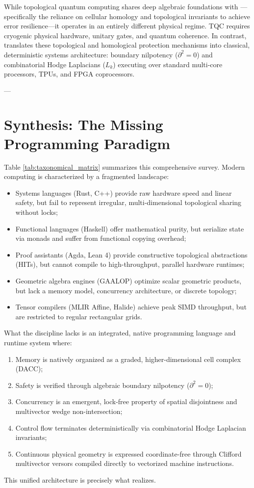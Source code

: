While topological quantum computing shares deep algebraic foundations with \ToposLang{}---specifically the reliance on cellular homology and topological invariants to achieve error resilience---it operates in an entirely different physical regime. TQC requires cryogenic physical hardware, unitary gates, and quantum coherence. In contrast, \ToposLang{} translates these topological and homological protection mechanisms into classical, deterministic systems architecture: boundary nilpotency ($\partial^2 = 0$) and combinatorial Hodge Laplacians ($L_k$) executing over standard multi-core processors, TPUs, and FPGA coprocessors.


---

\section{Synthesis: The Missing Programming Paradigm}
\label{sec:tax_synthesis}

Table \ref{tab:taxonomical_matrix} summarizes this comprehensive survey. Modern computing is characterized by a fragmented landscape:
\begin{itemize}[leftmargin=1.5cm]
    \item Systems languages (Rust, C++) provide raw hardware speed and linear safety, but fail to represent irregular, multi-dimensional topological sharing without locks;
    \item Functional languages (Haskell) offer mathematical purity, but serialize state via monads and suffer from functional copying overhead;
    \item Proof assistants (Agda, Lean 4) provide constructive topological abstractions (HITs), but cannot compile to high-throughput, parallel hardware runtimes;
    \item Geometric algebra engines (GAALOP) optimize scalar geometric products, but lack a memory model, concurrency architecture, or discrete topology;
    \item Tensor compilers (MLIR Affine, Halide) achieve peak SIMD throughput, but are restricted to regular rectangular grids.
\end{itemize}

What the discipline lacks is an integrated, native programming language and runtime system where:
\begin{enumerate}
    \item Memory is natively organized as a graded, higher-dimensional cell complex (DACC);
    \item Safety is verified through algebraic boundary nilpotency ($\partial^2 = 0$);
    \item Concurrency is an emergent, lock-free property of spatial disjointness and multivector wedge non-intersection;
    \item Control flow terminates deterministically via combinatorial Hodge Laplacian invariants;
    \item Continuous physical geometry is expressed coordinate-free through Clifford multivector versors compiled directly to vectorized machine instructions.
\end{enumerate}

This unified architecture is precisely what \ToposLang{} realizes.
